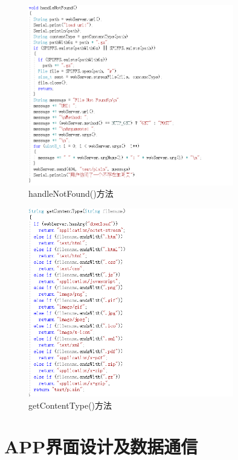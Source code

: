 \begin{figure}[htbp]
    \centering
    \includegraphics[width=0.8\textwidth]{figures/code/2}
    \caption{handleNotFound()方法}
\end{figure}

\begin{figure}[htbp]
    \centering
    \includegraphics[width=0.8\textwidth]{figures/code/3}
    \caption{getContentType()方法}
\end{figure}

\section{APP界面设计及数据通信}

